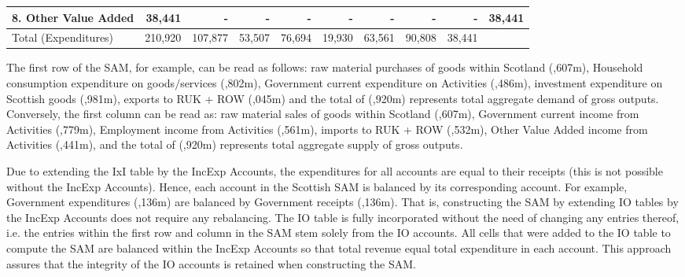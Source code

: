 \begin{table}[H]
\begin{scriptsize}
\begin{centering}
\begin{doublespacing}
\begin{tabular}{lrrrrrrrrr}
    8. Other Value Added & 38,441 & -     & -     & -     & -     & -     & -     & -     & 38,441 \bigstrut[b]\\
    \hline
    Total (Expenditures) & 210,920 & 107,877 & 53,507 & 76,694 & 19,930 & 63,561 & 90,808 & 38,441 &  \bigstrut\\
\bottomrule 
\end{tabular}%
\bigskip \begin{flushright} \end{flushright} \label{tab:2.3.1} 
\end{doublespacing} \end{centering} \end{scriptsize} \end{table} \bigskip

\newpage

The first row of the SAM, for example, can be read as follows: raw material purchases of goods within Scotland (,607m), Household consumption expenditure on goods$/$services (,802m), Government current expenditure on Activities (,486m), investment expenditure on Scottish goods (,981m), exports to RUK + ROW (,045m) and the total of (,920m) represents total aggregate demand of gross outputs. Conversely, the first column can be read as: raw material sales of goods within Scotland (,607m), Government current income from Activities (,779m), Employment income from Activities (,561m), imports to RUK + ROW (,532m), Other Value Added income from Activities (,441m), and the total of (,920m) represents total aggregate supply of gross outputs.   

\bigskip 

Due to extending the IxI table by the IncExp Accounts, the expenditures for all accounts are equal to their receipts (this is not possible without the IncExp Accounts). Hence, each account in the Scottish SAM is balanced by its corresponding account. For example, Government expenditures (,136m) are balanced by Government receipts (,136m). That is, constructing the SAM by extending IO tables by the IncExp Accounts does not require any rebalancing. The IO table is fully incorporated without the need of changing any entries thereof, i.e. the entries within the first row and column in the SAM stem solely from the IO accounts. All cells that were added to the IO table to compute the SAM are balanced within the IncExp Accounts so that total revenue equal total expenditure in each account. This approach assures that the integrity of the IO accounts is retained when constructing the SAM.

